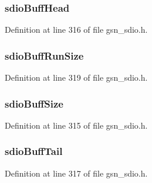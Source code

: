 \hypertarget{a00225_a1b050c7b46c786515a9ed7360b02bf6b}{
\subsubsection[{sdioBuffHead}]{ {\bf sdioBuffHead}}}
\label{a00225_a1b050c7b46c786515a9ed7360b02bf6b}


Definition at line 316 of file gsn\_\-sdio.h.

\hypertarget{a00225_aa11404063a1426961764af78dd2dce21}{
\subsubsection[{sdioBuffRunSize}]{ {\bf sdioBuffRunSize}}}
\label{a00225_aa11404063a1426961764af78dd2dce21}


Definition at line 319 of file gsn\_\-sdio.h.

\hypertarget{a00225_ad8a0bf8777517ff38b32e8a32c02b64d}{
\subsubsection[{sdioBuffSize}]{ {\bf sdioBuffSize}}}
\label{a00225_ad8a0bf8777517ff38b32e8a32c02b64d}


Definition at line 315 of file gsn\_\-sdio.h.

\hypertarget{a00225_afc8494dd3bf9dcef5fc5cd3f322094de}{
\subsubsection[{sdioBuffTail}]{ {\bf sdioBuffTail}}}
\label{a00225_afc8494dd3bf9dcef5fc5cd3f322094de}


Definition at line 317 of file gsn\_\-sdio.h.

